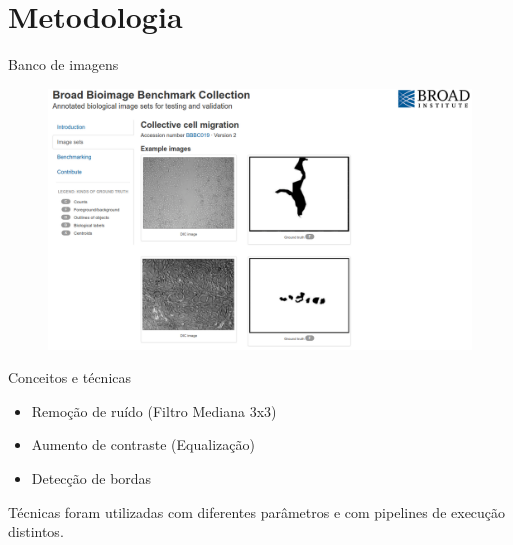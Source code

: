 \documentclass{beamer}
\begin{document}
\section{Metodologia}
\begin{frame}{Banco de imagens}

    \begin{figure}
      \includegraphics[width=1\textwidth]{imgs/banco.png}
    \end{figure}

\end{frame}

\begin{frame}{Conceitos e técnicas}
     \begin{itemize}
     \item Remoção de ruído (Filtro Mediana 3x3)
     \item Aumento de contraste (Equalização)
     \item Detecção de bordas
     \end{itemize}

     \vfill

     Técnicas foram utilizadas com diferentes parâmetros e com pipelines de execução
     distintos.

\end{frame}
\end{document}

